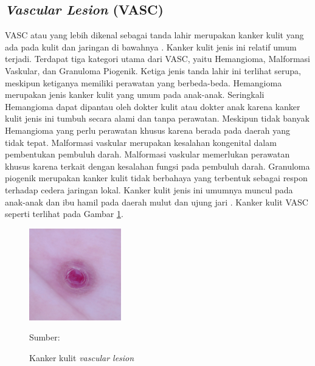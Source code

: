     \subsection{\textit{Vascular Lesion} (VASC)}
    VASC atau yang lebih dikenal sebagai tanda lahir merupakan kanker kulit yang ada pada kulit dan jaringan di bawahnya \citep{Balas2018}. Kanker kulit jenis ini relatif umum terjadi. Terdapat tiga kategori utama dari VASC, yaitu Hemangioma, Malformasi Vaskular, dan Granuloma Piogenik. Ketiga jenis tanda lahir ini terlihat serupa, meskipun ketiganya memiliki perawatan yang berbeda-beda. Hemangioma merupakan jenis kanker kulit yang umum pada anak-anak. Seringkali Hemangioma dapat dipantau oleh dokter kulit atau dokter anak karena kanker kulit jenis ini tumbuh secara alami dan tanpa perawatan. Meskipun tidak banyak Hemangioma yang perlu perawatan khusus karena berada pada daerah yang tidak tepat. Malformasi vaskular merupakan kesalahan kongenital dalam pembentukan pembuluh darah. Malformasi vaskular memerlukan perawatan khusus karena terkait dengan kesalahan fungsi pada pembuluh darah. Granuloma piogenik merupakan kanker kulit tidak berbahaya yang terbentuk sebagai respon terhadap cedera jaringan lokal. Kanker kulit jenis ini umumnya muncul pada anak-anak dan ibu hamil pada daerah mulut dan ujung jari \citep{Rastogi2020}. Kanker kulit VASC seperti terlihat pada Gambar \ref{fig:vasc}.
    \begin{figure}[H] 
        \begin{center} 
            \includegraphics[width=4cm]{../img/Skin Cancer VASC - Latex.jpg}
            \caption{Kanker kulit \textit{vascular lesion}} 
            \label{fig:vasc}
            Sumber: \citep{Codella2018,Combalia2019,Tschandl2018}
        \end{center} 
    \end{figure}

